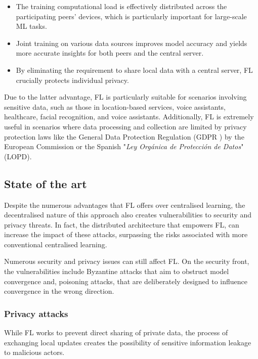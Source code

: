 \begin{itemize}
        \item The training computational load is effectively distributed across the participating peers' devices, which is particularly important for large-scale ML tasks.
        \item Joint training on various data sources improves model accuracy and yields more accurate insights for both peers and the central server.
        \item  By eliminating the requirement to share local data with a central server, FL crucially protects individual privacy.
\end{itemize}

Due to the latter advantage, FL is particularly suitable for scenarios involving sensitive data, such as those in location-based services, voice assistants, healthcare,  facial recognition, and voice assistants. Additionally, FL is extremely useful in scenarios where data processing and collection are limited by privacy protection laws like the General Data Protection Regulation (GDPR \cite{GDPR}) by the European Commission or the Spanish "\textit{Ley Orgánica de Protección de Datos}" (LOPD).

\subsection{State of the art}\label{sec:state_of_the_art}
Despite the numerous advantages that FL offers over centralised learning, the decentralised nature of this approach also creates vulnerabilities to security and privacy threats. In fact, the distributed architecture that empowers FL, can increase the impact of these attacks, surpassing the risks associated with more conventional centralised learning.

Numerous security and privacy issues can still affect FL. On the security front, the vulnerabilities include Byzantine attacks that aim to obstruct model convergence and, poisoning attacks, that are deliberately designed to influence convergence in the wrong direction.

\subsubsection{Privacy attacks}
While FL works to prevent direct sharing of private data, the process of exchanging local updates creates the possibility of sensitive information leakage to malicious actors.

